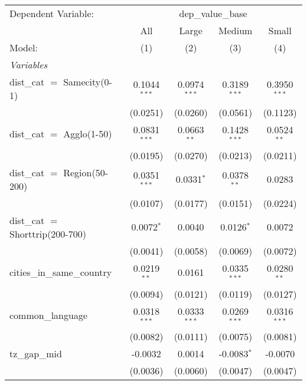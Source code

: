 \begingroup
\centering
\begin{tabular}{lcccc}
   \tabularnewline \midrule \midrule
   Dependent Variable: & \multicolumn{4}{c}{dep\_value\_base}\\
                                     & All            & Large          & Medium         & Small \\   
   Model:                            & (1)            & (2)            & (3)            & (4)\\  
   \midrule
   \emph{Variables}\\
   dist\_cat $=$ Samecity(0-1)       & 0.1044$^{***}$ & 0.0974$^{***}$ & 0.3189$^{***}$ & 0.3950$^{***}$\\   
                                     & (0.0251)       & (0.0260)       & (0.0561)       & (0.1123)\\   
   dist\_cat $=$ Agglo(1-50)         & 0.0831$^{***}$ & 0.0663$^{**}$  & 0.1428$^{***}$ & 0.0524$^{**}$\\   
                                     & (0.0195)       & (0.0270)       & (0.0213)       & (0.0211)\\   
   dist\_cat $=$ Region(50-200)      & 0.0351$^{***}$ & 0.0331$^{*}$   & 0.0378$^{**}$  & 0.0283\\   
                                     & (0.0107)       & (0.0177)       & (0.0151)       & (0.0224)\\   
   dist\_cat $=$ Shorttrip(200-700)  & 0.0072$^{*}$   & 0.0040         & 0.0126$^{*}$   & 0.0072\\   
                                     & (0.0041)       & (0.0058)       & (0.0069)       & (0.0072)\\   
   cities\_in\_same\_country         & 0.0219$^{**}$  & 0.0161         & 0.0335$^{***}$ & 0.0280$^{**}$\\   
                                     & (0.0094)       & (0.0121)       & (0.0119)       & (0.0127)\\   
   common\_language                  & 0.0318$^{***}$ & 0.0333$^{***}$ & 0.0269$^{***}$ & 0.0316$^{***}$\\   
                                     & (0.0082)       & (0.0111)       & (0.0075)       & (0.0081)\\   
   tz\_gap\_mid                      & -0.0032        & 0.0014         & -0.0083$^{*}$  & -0.0070\\   
                                     & (0.0036)       & (0.0060)       & (0.0047)       & (0.0047)\\   

\end{tabular}
